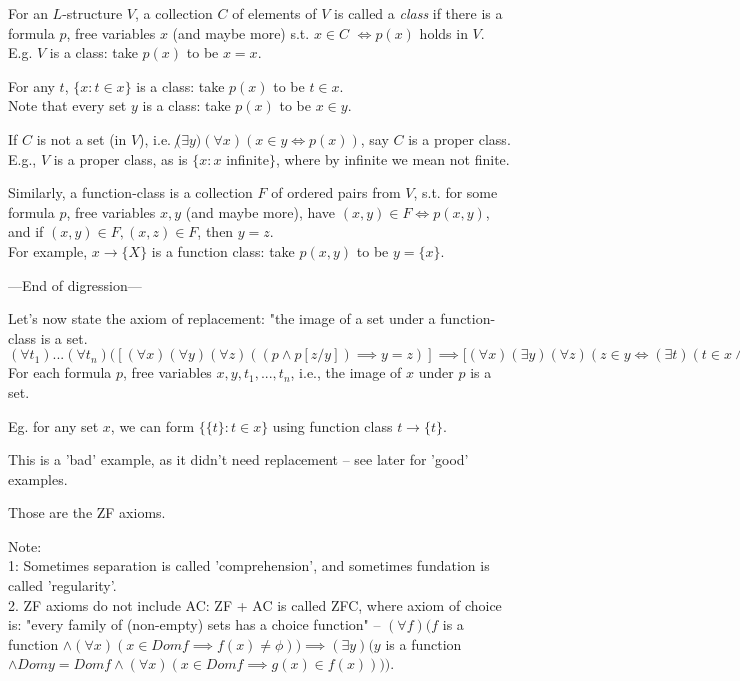 \documentclass[a4paper]{article}
\begin{document}
For an $L$-structure $V$, a collection $C$ of elements of $V$ is called a \emph{class} if there is a formula $p$, free variables $x$ (and maybe more) s.t. $x \in C$ $\iff p(x)$ holds in $V$. E.g. $V$ is a class: take $p(x)$ to be $x=x$.

For any $t$, $\{x: t \in x\}$ is a class: take $p(x)$ to be $t \in x$.\\
Note that every set $y$ is a class: take $p(x)$ to be $x \in y$.

If $C$ is not a set (in $V$), i.e. $\not (\exists y)(\forall x)(x \in y \iff p(x))$, say $C$ is a proper class. E.g., $V$ is a proper class, as is $\{x:x$ infinite$\}$, where by infinite we mean not finite.

Similarly, a function-class is a collection $F$ of ordered pairs from $V$, s.t. for some formula $p$, free variables $x,y$ (and maybe more), have $(x,y) \in F \iff p(x,y)$, and if $(x,y) \in F, (x,z) \in F$, then $y=z$.\\
For example, $x \to \{X\}$ is a function class: take $p(x,y)$ to be $y=\{x\}$.

---End of digression---

Let's now state the axiom of replacement: "the image of a set under a function-class is a set.\\
$(\forall t_1) ... (\forall t_n) ([(\forall x)(\forall y)(\forall z) ((p \wedge p[z/y] ) \implies y=z)] \implies [(\forall x)(\exists y) (\forall z) (z \in y \iff (\exists t) (t \in x \wedge p[t/x,z/y])])$\\
For each formula $p$, free variables $x,y,t_1,...,t_n$, i.e., the image of $x$ under $p$ is a set.

Eg. for any set $x$, we can form $\{\{t\}:t \in x\}$ using function class $t \to \{t\}$.

This is a 'bad' example, as it didn't need replacement -- see later for 'good' examples.

Those are the ZF axioms.

Note:\\
1: Sometimes separation is called 'comprehension', and sometimes fundation is called 'regularity'.\\
2. ZF axioms do not include AC: ZF + AC is called ZFC, where axiom of choice is: "every family of (non-empty) sets has a choice function" -- $ (\forall f) (f$ is a function $\wedge (\forall x) (x \in Dom f \implies f(x) \neq \phi)) \implies (\exists y) (y$ is a function $ \wedge Dom y = Dom f \wedge (\forall x)(x \in Dom f \implies g(x) \in f(x))))$.
\end{document}

